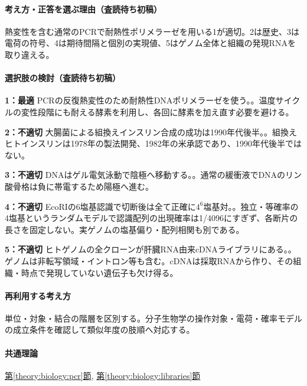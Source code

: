 \paragraph{考え方・正答を選ぶ理由（査読待ち初稿）} 熱変性を含む通常のPCRで耐熱性ポリメラーゼを用いる1が適切。2は歴史、3は電荷の符号、4は期待間隔と個別の実現値、5はゲノム全体と組織の発現RNAを取り違える。

\paragraph{選択肢の検討（査読待ち初稿）}\mbox{}\par

\noindent\textbf{1：最適} PCRの反復熱変性のため耐熱性DNAポリメラーゼを使う。。温度サイクルの変性段階にも耐える酵素を利用し、各回に酵素を加え直す必要を避ける。\par

\noindent\textbf{2：不適切} 大腸菌による組換えインスリン合成の成功は1990年代後半。。組換えヒトインスリンは1978年の製法開発、1982年の米承認であり、1990年代後半ではない。\par

\noindent\textbf{3：不適切} DNAはゲル電気泳動で陰極へ移動する。。通常の緩衝液でDNAのリン酸骨格は負に帯電するため陽極へ進む。\par

\noindent\textbf{4：不適切} EcoRIの6塩基認識で切断後は全て正確に\(4^6\)塩基対。。独立・等確率の4塩基というランダムモデルで認識配列の出現確率は1/4096にすぎず、各断片の長さを固定しない。実ゲノムの塩基偏り・配列相関も別である。\par

\noindent\textbf{5：不適切} ヒトゲノムの全クローンが肝臓RNA由来cDNAライブラリにある。。ゲノムは非転写領域・イントロン等も含む。cDNAは採取RNAから作り、その組織・時点で発現していない遺伝子も欠け得る。\par

\paragraph{再利用する考え方} 単位・対象・結合の階層を区別する。分子生物学の操作対象・電荷・確率モデルの成立条件を確認して類似年度の肢順へ対応する。

\paragraph{共通理論} \hyperref[theory:biology:pcr]{第\ref*{theory:biology:pcr}節}, \hyperref[theory:biology:libraries]{第\ref*{theory:biology:libraries}節}

